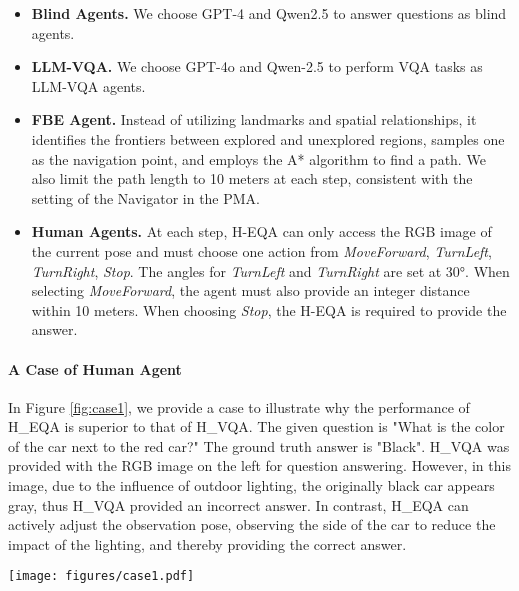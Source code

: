 \begin{itemize}[leftmargin=*]

    \item \textbf{Blind Agents.} We choose GPT-4 \cite{achiam2023gpt} and Qwen2.5 \cite{yang2024qwen2} to answer questions as blind agents.
    
    \item \textbf{LLM-VQA.} We choose GPT-4o and Qwen-2.5 to perform VQA tasks as LLM-VQA agents.

    \item \textbf{FBE Agent.} Instead of utilizing landmarks and spatial relationships, it identifies the frontiers between explored and unexplored regions, samples one as the navigation point, and employs the A* algorithm to find a path.  We also limit the path length to 10 meters at each step, consistent with the setting of the Navigator in the PMA.

    \item \textbf{Human Agents.} At each step, H-EQA can only access the RGB image of the current pose and must choose one action from {\textit{MoveForward}, \textit{TurnLeft}, \textit{TurnRight}, \textit{Stop}}. The angles for \textit{TurnLeft} and \textit{TurnRight} are set at 30°. When selecting \textit{MoveForward}, the agent must also provide an integer distance within 10 meters. When choosing \textit{Stop}, the H-EQA is required to provide the answer.
    
\end{itemize}


\paragraph{A Case of Human Agent}
\label{a_baseline}

In Figure \ref{fig:case1}, we provide a case to illustrate why the performance of H\_EQA is superior to that of H\_VQA. The given question is "What is the color of the car next to the red car?" The ground truth answer is "Black". H\_VQA was provided with the RGB image on the left for question answering. However, in this image, due to the influence of outdoor lighting, the originally black car appears gray, thus H\_VQA provided an incorrect answer. In contrast, H\_EQA can actively adjust the observation pose, observing the side of the car to reduce the impact of the lighting, and thereby providing the correct answer.


\begin{figure*}[!htb]
\centering
    \texttt{[image: figures/case1.pdf]}
\caption{The images obtained by H-VQA and H-EQA.}
\label{fig:case1}
\end{figure*}

